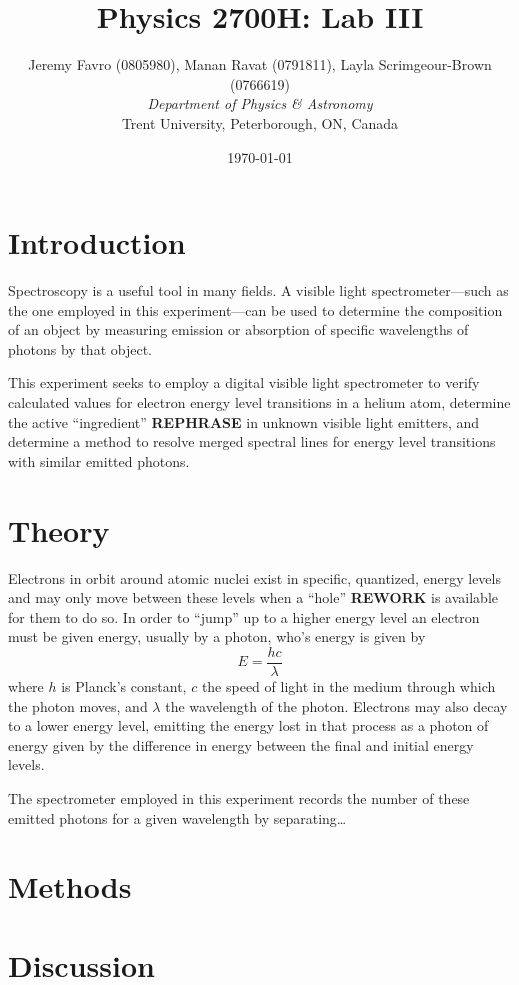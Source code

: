 \documentclass[10pt, twocolumn]{article}
\title{Physics 2700H: Lab III}
\author{Jeremy Favro (0805980),
Manan Ravat (0791811),
Layla Scrimgeour-Brown (0766619)
 \\\emph{Department of Physics \& Astronomy}\\ Trent University, Peterborough, ON, Canada}
\date{\today}
\theoremstyle{definition}
\begin{document}
\maketitle
\begin{abstract}
\end{abstract}
\section{Introduction}
Spectroscopy is a useful tool in many fields. A visible light spectrometer---such as the one employed in this experiment---can be used to determine the composition of an object by measuring emission or absorption of
specific wavelengths of photons by that object.

This experiment seeks to employ a digital visible light spectrometer to verify calculated values for electron energy level transitions in a helium atom,
determine the active ``ingredient'' \textbf{REPHRASE} in unknown visible light emitters, and determine a method to resolve merged spectral lines for energy
level transitions with similar emitted photons.
\section{Theory}
Electrons in orbit around atomic nuclei exist in specific, quantized, energy levels and may only move between these levels when a ``hole'' \textbf{REWORK}
is available for them to do so. In order to ``jump'' up to a higher energy level an electron must be given energy, usually by a photon, who's energy is given by
$$E=\frac{hc}{\lambda}$$ where $h$ is Planck's constant\cite{codata}, $c$ the speed of light in the medium through which the photon moves, and $\lambda$ the
wavelength of the photon. Electrons may also decay to a lower energy level, emitting the energy lost in that process as a photon of energy given by the difference in energy
between the final and initial energy levels.

The spectrometer employed in this experiment records the number of these emitted photons for a given wavelength by separating\dots
\section{Methods}
\lipsum[3-5]
\section{Discussion}
\end{document}
